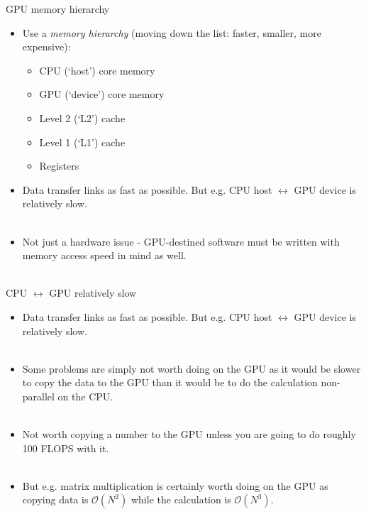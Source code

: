 \documentclass[usenames,dvipsnames]{beamer}
\begin{document}
\begin{frame}{GPU memory hierarchy}
  \begin{block}{}
    \begin{itemize}
      \item{Use a \textit{memory hierarchy} (moving down the list: faster, smaller, more expensive):}
      \begin{itemize}
      \item{CPU (`host') core memory}
      \item{GPU (`device') core memory}
      \item{Level 2 (`L2') cache}
      \item{Level 1 (`L1') cache}
      \item{Registers}
      \end{itemize}
      \item{Data transfer links as fast as possible. But e.g. CPU host $\leftrightarrow$ GPU device is relatively slow.}\\~\
      \item{Not just a hardware issue - GPU-destined software must be written with memory access speed in mind as well.}\\~\
    \end{itemize}
  \end{block}
\end{frame}

\begin{frame}{CPU $\leftrightarrow$ GPU relatively slow}
  \begin{block}{}
    \begin{itemize}
      \item{Data transfer links as fast as possible. But e.g. CPU host $\leftrightarrow$ GPU device is relatively slow.}\\~\
      \item{Some problems are simply not worth doing on the GPU as it would be slower to copy the data to the GPU than it would be to do the calculation non-parallel on the CPU.}\\~\
      \item{Not worth copying a number to the GPU unless you are going to do roughly 100 FLOPS with it.}\\~\
      \item{But e.g. matrix multiplication is certainly worth doing on the GPU as copying data is $\mathcal{O}(N^2)$ while the calculation is $\mathcal{O}(N^3)$.}\\~\
    \end{itemize}
  \end{block}
\end{frame}
\end{document}
